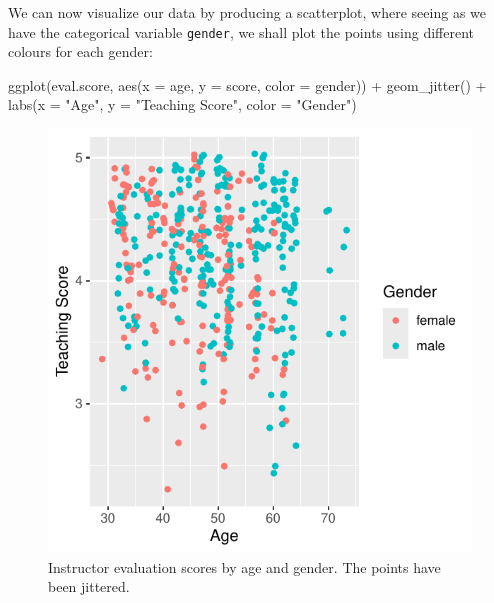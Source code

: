 \documentclass[
  letterpaper,
  DIV=11,
  numbers=noendperiod]{scrartcl}
\newenvironment{Shaded}{\begin{snugshade}}{\end{snugshade}}
\newcommand{\AttributeTok}[1]{\textcolor[rgb]{0.40,0.45,0.13}{#1}}
\newcommand{\FunctionTok}[1]{\textcolor[rgb]{0.28,0.35,0.67}{#1}}
\newcommand{\NormalTok}[1]{\textcolor[rgb]{0.00,0.23,0.31}{#1}}
\newcommand{\SpecialCharTok}[1]{\textcolor[rgb]{0.37,0.37,0.37}{#1}}
\newcommand{\StringTok}[1]{\textcolor[rgb]{0.13,0.47,0.30}{#1}}
\begin{document}
We can now visualize our data by producing a scatterplot, where seeing
as we have the categorical variable \texttt{gender}, we shall plot the
points using different colours for each gender:

\begin{Shaded}
\begin{Highlighting}[]
\FunctionTok{ggplot}\NormalTok{(eval.score, }
       \FunctionTok{aes}\NormalTok{(}\AttributeTok{x =}\NormalTok{ age, }\AttributeTok{y =}\NormalTok{ score, }\AttributeTok{color =}\NormalTok{ gender)) }\SpecialCharTok{+}
  \FunctionTok{geom\_jitter}\NormalTok{() }\SpecialCharTok{+}
  \FunctionTok{labs}\NormalTok{(}\AttributeTok{x =} \StringTok{"Age"}\NormalTok{, }\AttributeTok{y =} \StringTok{"Teaching Score"}\NormalTok{, }\AttributeTok{color =} \StringTok{"Gender"}\NormalTok{) }
\end{Highlighting}
\end{Shaded}

\begin{figure}[H]

{\centering \includegraphics{notes_files/figure-pdf/unnamed-chunk-6-1.pdf}

}

\caption{Instructor evaluation scores by age and gender. The points have
been jittered.}

\end{figure}%
\end{document}

